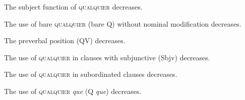 \begin{listWWNumxvleveli}
\item 
\begin{styleStandard}
The subject function of \textsc{qualquier} decreases.
\end{styleStandard}
\item 
\begin{styleStandard}
The use of bare \textsc{qualquier} (bare Q) without nominal modification decreases.
\end{styleStandard}
\item 
\begin{styleStandard}
The preverbal position (QV) decreases. 
\end{styleStandard}
\item 
\begin{styleStandard}
The use of \textsc{qualquier} in clauses with subjunctive (Sbjv) decreases. 
\end{styleStandard}
\item 
\begin{styleStandard}
The use of \textsc{qualquier} in subordinated clauses decreases.
\end{styleStandard}
\item 
\begin{styleStandard}
The use of \textsc{qualquier}\textit{ que} (Q \textit{que}) decreases.
\end{styleStandard}
\end{listWWNumxvleveli}
